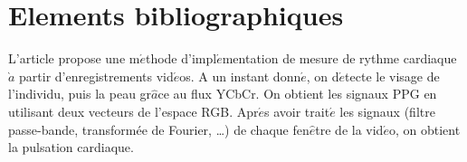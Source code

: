 \documentclass[12 pt]{article}
\begin{document}
\section{Elements bibliographiques}
L'article \cite{Ufuk} propose une m$\acute{e}$thode d'impl$\acute{e}$mentation de mesure de rythme cardiaque $\grave{a}$ partir d'enregistrements vid$\acute{e}$os.
A un instant donn$\acute{e}$, on d$\acute{e}$tecte le visage de l'individu, puis la peau gr$\hat{a}$ce au flux YCbCr. On obtient les signaux PPG en utilisant deux vecteurs de l'espace RGB. 
Apr$\acute{e}$s avoir trait$\acute{e}$ les signaux (filtre passe-bande, transformée de Fourier, …) de chaque fen$\hat{e}$tre de la vid$\acute{e}$o, on obtient la pulsation cardiaque.

\end{document}
